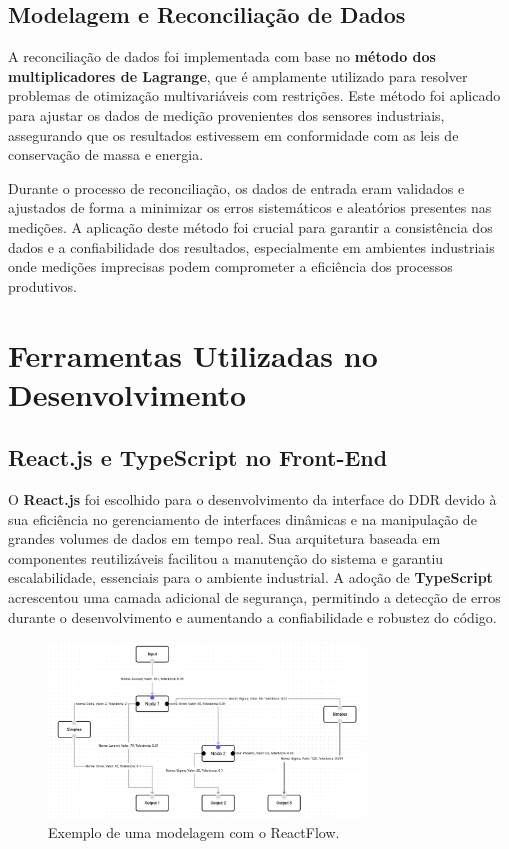 \subsection{Modelagem e Reconciliação de Dados}

A reconciliação de dados foi implementada com base no \textbf{método dos multiplicadores de Lagrange}, que é amplamente utilizado para resolver problemas de otimização multivariáveis com restrições. Este método foi aplicado para ajustar os dados de medição provenientes dos sensores industriais, assegurando que os resultados estivessem em conformidade com as leis de conservação de massa e energia.

Durante o processo de reconciliação, os dados de entrada eram validados e ajustados de forma a minimizar os erros sistemáticos e aleatórios presentes nas medições. A aplicação deste método foi crucial para garantir a consistência dos dados e a confiabilidade dos resultados, especialmente em ambientes industriais onde medições imprecisas podem comprometer a eficiência dos processos produtivos.

\section{Ferramentas Utilizadas no Desenvolvimento}

\subsection{React.js e TypeScript no Front-End}

O \textbf{React.js} foi escolhido para o desenvolvimento da interface do DDR devido à sua eficiência no gerenciamento de interfaces dinâmicas e na manipulação de grandes volumes de dados em tempo real. Sua arquitetura baseada em componentes reutilizáveis facilitou a manutenção do sistema e garantiu escalabilidade, essenciais para o ambiente industrial. A adoção de \textbf{TypeScript} acrescentou uma camada adicional de segurança, permitindo a detecção de erros durante o desenvolvimento e aumentando a confiabilidade e robustez do código.

\begin{figure}[htbp!]
    \begin{center}
        \includegraphics[width=0.75\textwidth]{figuras/reactflow.png}
        \caption{Exemplo de uma modelagem com o ReactFlow.}
        \label{fig:ReactFlowPicture}
    \end{center}
\end{figure}

